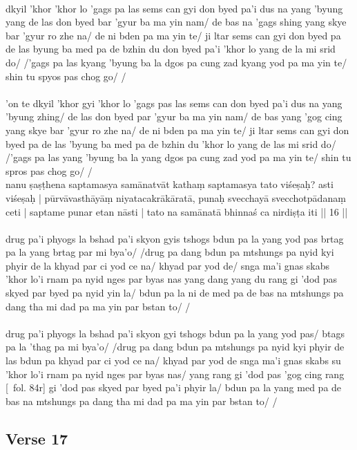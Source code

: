 \documentclass[12pt]{article}
\begin{document}
\textbf{\TVA}\\
dkyil 'khor 'khor lo 'gags pa las sems can gyi don byed pa'i dus na yang 'byung yang de las don byed bar 'gyur ba ma yin nam/ de bas na 'gags shing yang skye bar 'gyur ro zhe na/ de ni bden pa ma yin te/ ji ltar sems can gyi don byed pa de las byung ba med pa de bzhin du don byed pa'i 'khor lo yang de la mi srid do/ /'gags pa las kyang 'byung ba la dgos pa cung zad kyang yod pa ma yin te/ shin tu spyos pas chog go/ /\\

\textbf{\TVB}\\
'on te dkyil 'khor gyi 'khor lo 'gags pas las sems can don byed pa'i dus na yang 'byung zhing/ de las don byed par 'gyur ba ma yin nam/ de bas yang 'gog cing yang skye bar 'gyur ro zhe na/ de ni bden pa ma yin te/ ji ltar sems can gyi don byed pa de las 'byung ba med pa de bzhin du 'khor lo yang de las mi srid do/ /'gags pa las yang 'byung ba la yang dgos pa cung zad yod pa ma yin te/ shin tu spros pas chog go/ /\\

nanu ṣaṣṭhena saptamasya samānatvāt kathaṃ saptamasya tato viśeṣaḥ? asti viśeṣaḥ | pūrvāvasthāyāṃ niyatacakrākāratā, punaḥ svecchayā svecchotpādanaṃ ceti | saptame punar etan nāsti | tato na samānatā bhinnaś ca nirdiṣṭa iti || 16 ||\\

\textbf{\TVA}\\
drug pa'i phyogs la bshad pa'i skyon gyis tshogs bdun pa la yang yod pas brtag pa la yang brtag par mi bya'o/ /drug pa dang bdun pa mtshungs pa nyid kyi phyir de la khyad par ci yod ce na/ khyad par yod de/ snga ma'i gnas skabs 'khor lo'i rnam pa nyid nges par byas nas yang dang yang du rang gi 'dod pas skyed par byed pa nyid yin la/ bdun pa la ni de med pa de bas na mtshungs pa dang tha mi dad pa ma yin par bstan to/ /\\

\textbf{\TVB}\\
drug pa'i phyogs la bshad pa'i skyon gyi tshogs bdun pa la yang yod pas/ btags pa la 'thag pa mi bya'o/ /drug pa dang bdun pa mtshungs pa nyid kyi phyir de las bdun pa khyad par ci yod ce na/ khyad par yod de snga ma'i gnas skabs su 'khor lo'i rnam pa nyid nges par byas nas/ yang rang gi 'dod pas 'gog cing rang [\TVB\ fol. 84r] gi 'dod pas skyed par byed pa'i phyir la/ bdun pa la yang med pa de bas na mtshungs pa dang tha mi dad pa ma yin par bstan to/ /

\subsection{Verse 17}
\end{document}

